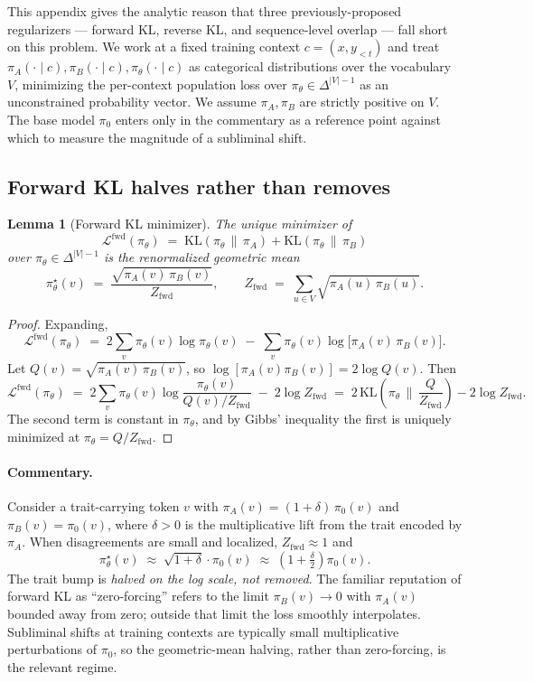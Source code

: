 \documentclass[11pt]{article}
\newtheorem{lemma}{Lemma}
\begin{document}
This appendix gives the analytic reason that three previously-proposed regularizers --- forward KL, reverse KL, and sequence-level overlap --- fall short on this problem. We work at a fixed training context $c = (x, y_{<t})$ and treat $\pi_A(\cdot \mid c), \pi_B(\cdot \mid c), \pi_\theta(\cdot \mid c)$ as categorical distributions over the vocabulary $V$, minimizing the per-context population loss over $\pi_\theta \in \Delta^{|V|-1}$ as an unconstrained probability vector. We assume $\pi_A, \pi_B$ are strictly positive on $V$. The base model $\pi_0$ enters only in the commentary as a reference point against which to measure the magnitude of a subliminal shift.

\subsection{Forward KL halves rather than removes}

\begin{lemma}[Forward KL minimizer]
\label{lem:fwd}
The unique minimizer of
\[
\mathcal{L}^{\mathrm{fwd}}(\pi_\theta) \;=\; \mathrm{KL}(\pi_\theta \,\|\, \pi_A) + \mathrm{KL}(\pi_\theta \,\|\, \pi_B)
\]
over $\pi_\theta \in \Delta^{|V|-1}$ is the renormalized geometric mean
\[
\pi_\theta^\star(v) \;=\; \frac{\sqrt{\pi_A(v)\, \pi_B(v)}}{Z_{\mathrm{fwd}}}, \qquad Z_{\mathrm{fwd}} \;=\; \sum_{u \in V} \sqrt{\pi_A(u)\, \pi_B(u)}.
\]
\end{lemma}

\begin{proof}
Expanding,
\[
\mathcal{L}^{\mathrm{fwd}}(\pi_\theta) \;=\; 2 \sum_v \pi_\theta(v) \log \pi_\theta(v) \;-\; \sum_v \pi_\theta(v) \log\bigl[\pi_A(v)\, \pi_B(v)\bigr].
\]
Let $Q(v) = \sqrt{\pi_A(v)\, \pi_B(v)}$, so $\log[\pi_A(v)\pi_B(v)] = 2 \log Q(v)$. Then
\[
\mathcal{L}^{\mathrm{fwd}}(\pi_\theta) \;=\; 2 \sum_v \pi_\theta(v) \log \frac{\pi_\theta(v)}{Q(v)/Z_{\mathrm{fwd}}} \;-\; 2 \log Z_{\mathrm{fwd}} \;=\; 2\, \mathrm{KL}\!\left(\pi_\theta \,\Big\|\, \frac{Q}{Z_{\mathrm{fwd}}}\right) - 2 \log Z_{\mathrm{fwd}}.
\]
The second term is constant in $\pi_\theta$, and by Gibbs' inequality the first is uniquely minimized at $\pi_\theta = Q/Z_{\mathrm{fwd}}$.
\end{proof}

\paragraph{Commentary.} Consider a trait-carrying token $v$ with $\pi_A(v) = (1+\delta)\, \pi_0(v)$ and $\pi_B(v) = \pi_0(v)$, where $\delta > 0$ is the multiplicative lift from the trait encoded by $\pi_A$. When disagreements are small and localized, $Z_{\mathrm{fwd}} \approx 1$ and
\[
\pi_\theta^\star(v) \;\approx\; \sqrt{1 + \delta} \cdot \pi_0(v) \;\approx\; \left(1 + \tfrac{\delta}{2}\right) \pi_0(v).
\]
The trait bump is \emph{halved on the log scale, not removed}. The familiar reputation of forward KL as ``zero-forcing'' refers to the limit $\pi_B(v) \to 0$ with $\pi_A(v)$ bounded away from zero; outside that limit the loss smoothly interpolates. Subliminal shifts at training contexts are typically small multiplicative perturbations of $\pi_0$, so the geometric-mean halving, rather than zero-forcing, is the relevant regime.
\end{document}
